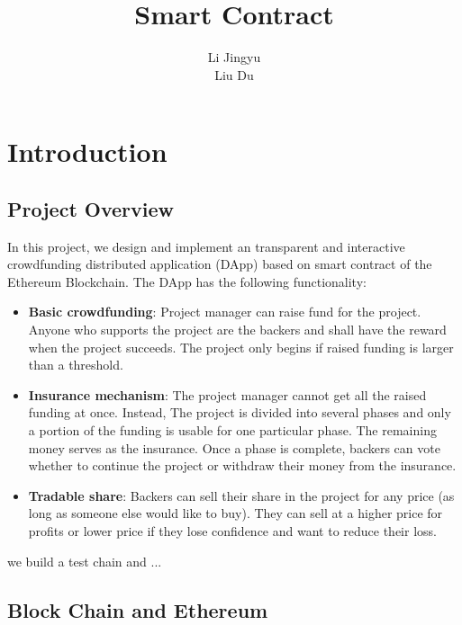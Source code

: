 \documentclass{article}
\title{Smart Contract }
\author{Li Jingyu\quad 517030910318\\Liu Du\quad 517030910346}
\begin{document}
\maketitle

\newcommand{\vecb}[2]{\boldsymbol{#1}^{(#2)}}
\newcommand{\code}[1]{{\ttfamily #1}}

\tableofcontents

\section{Introduction}

\subsection{Project Overview}
\label{sec:proj}
In this project, we design and implement an transparent and interactive crowdfunding distributed application (DApp) based on smart contract of the Ethereum Blockchain. The DApp has the following functionality:
\begin{itemize}
    \item \textbf{Basic crowdfunding}: Project manager can raise fund for the project. Anyone who supports the project are the backers and shall have the reward when the project succeeds. The project only begins if raised funding is larger than a threshold.
    \item \textbf{Insurance mechanism}: The project manager cannot get all the raised funding at once. Instead, The project is divided into several phases and only a portion of the funding is usable for one particular phase. The remaining money serves as the insurance. Once a phase is complete, backers can vote whether to continue the project or withdraw their money from the insurance.
    \item \textbf{Tradable share}: Backers can sell their share in the project for any price (as long as someone else would like to buy). They can sell at a higher price for profits or lower price if they lose confidence and want to reduce their loss.
\end{itemize}

we build a test chain and ...

\subsection{Block Chain and Ethereum}
\end{document}
